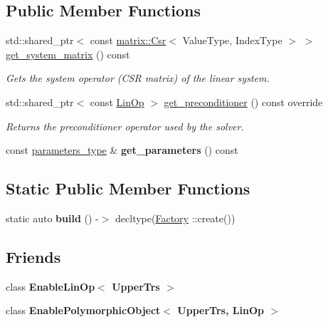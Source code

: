 \subsection*{Public Member Functions}
\begin{DoxyCompactItemize}
\item 
std\+::shared\+\_\+ptr$<$ const \hyperlink{classgko_1_1matrix_1_1Csr}{matrix\+::\+Csr}$<$ Value\+Type, Index\+Type $>$ $>$ \hyperlink{classgko_1_1solver_1_1UpperTrs_a5634d236ea80f6e0ad0bb80aae965a78}{get\+\_\+system\+\_\+matrix} () const
\begin{DoxyCompactList}\small\item\em Gets the system operator (C\+SR matrix) of the linear system. \end{DoxyCompactList}\item 
std\+::shared\+\_\+ptr$<$ const \hyperlink{classgko_1_1LinOp}{Lin\+Op} $>$ \hyperlink{classgko_1_1solver_1_1UpperTrs_ac9e8b508f5319d7a273ebb76b22f3349}{get\+\_\+preconditioner} () const override
\begin{DoxyCompactList}\small\item\em Returns the preconditioner operator used by the solver. \end{DoxyCompactList}\item 
\mbox{\label{classgko_1_1solver_1_1UpperTrs_a37fa165fc38663072ef41ad10ca0e11c}} 
const \hyperlink{structgko_1_1solver_1_1UpperTrs_1_1parameters__type}{parameters\+\_\+type} \& {\bfseries get\+\_\+parameters} () const
\end{DoxyCompactItemize}
\subsection*{Static Public Member Functions}
\begin{DoxyCompactItemize}
\item 
\mbox{\label{classgko_1_1solver_1_1UpperTrs_ae0718f752bc09a9df5b7de9bbc28e348}} 
static auto {\bfseries build} () -\/$>$ decltype(\hyperlink{classgko_1_1solver_1_1UpperTrs_1_1Factory}{Factory} \+::create())
\end{DoxyCompactItemize}
\subsection*{Friends}
\begin{DoxyCompactItemize}
\item 
\mbox{\label{classgko_1_1solver_1_1UpperTrs_ace1f94d11afd9219da2b56ee51b5b0e9}} 
class {\bfseries Enable\+Lin\+Op$<$ Upper\+Trs $>$}
\item 
\mbox{\label{classgko_1_1solver_1_1UpperTrs_a2f2f9845d1fc77478b1a53d3c3334a5d}} 
class {\bfseries Enable\+Polymorphic\+Object$<$ Upper\+Trs, Lin\+Op $>$}
\end{DoxyCompactItemize}


